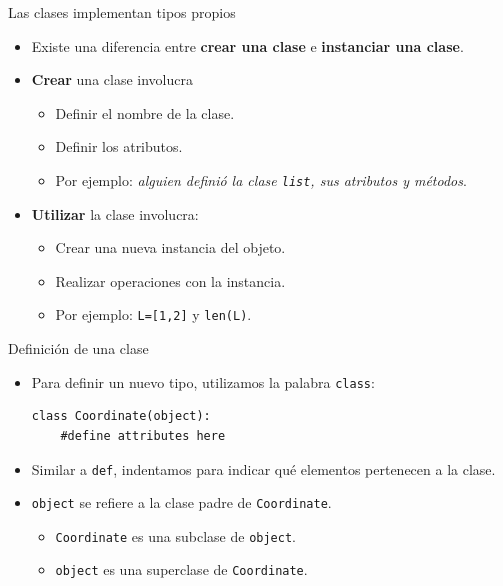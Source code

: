 \documentclass[mathserif]{beamer}
\begin{document}
\begin{frame}[fragile]{Las clases implementan tipos propios}
    \begin{itemize}
        \item Existe una diferencia entre {\blue\bfseries crear una clase} e {\blue\bfseries instanciar una clase}.
        
        \item {\blue\bfseries Crear} una clase involucra
        \begin{itemize}
            \item Definir el nombre de la clase.
            \item Definir los atributos.
            \item Por ejemplo: \textit{alguien definió la clase \lstinline|list|, sus atributos y métodos}.
        \end{itemize}
        
        \item {\blue\bfseries Utilizar} la clase involucra:
        \begin{itemize}
            \item Crear una nueva {\orange instancia} del objeto.
            \item Realizar operaciones con la instancia.
            \item Por ejemplo: \lstinline|L=[1,2]| y \lstinline|len(L)|.
        \end{itemize}
    \end{itemize}
\end{frame}


\begin{frame}[fragile]{Definición de una clase}
    \begin{itemize}
        \item Para definir un nuevo tipo, utilizamos la palabra \lstinline|class|:
\begin{lstlisting}
class Coordinate(object):
    #define attributes here
\end{lstlisting}

         \item Similar a \lstinline|def|, {\blue indentamos} para indicar qué elementos pertenecen a la clase.
         
         \item \lstinline|object| se refiere a la {\blue clase padre} de \lstinline|Coordinate|.
         \begin{itemize}
             \item \lstinline|Coordinate| es una subclase de \lstinline|object|.
             \item \lstinline|object| es una superclase de \lstinline|Coordinate|.
         \end{itemize}
    \end{itemize}
\end{frame}
\end{document}
